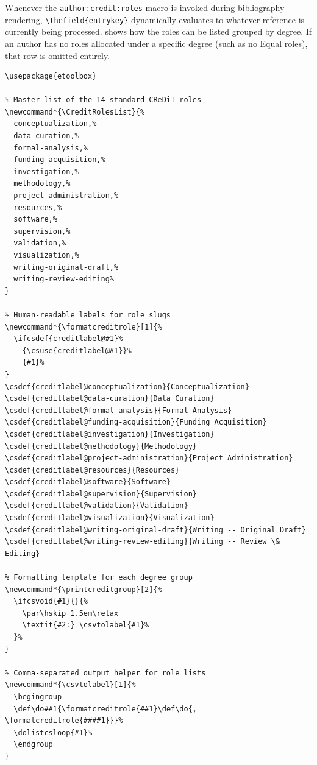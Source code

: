 \documentclass[12pt, twoside]{article}
\begin{document}
Whenever the \texttt{author:credit:roles} macro is invoked during bibliography rendering, \texttt{\textbackslash thefield\{entrykey\}} dynamically evaluates to whatever reference is currently being processed.  shows how the roles can be listed grouped by degree. If an author has no roles allocated under a specific degree (such as no Equal roles), that row is omitted entirely.
\begin{lstlisting}[style=latexExampleForAuthors, escapechar=|, basicstyle=\footnotesize, caption={{Listing CReDiT roles grouped by degree}}, label=lst:biberCReDiTrolesGroupedByDegree]
\usepackage{etoolbox}

% Master list of the 14 standard CReDiT roles
\newcommand*{\CreditRolesList}{%
  conceptualization,%
  data-curation,%
  formal-analysis,%
  funding-acquisition,%
  investigation,%
  methodology,%
  project-administration,%
  resources,%
  software,%
  supervision,%
  validation,%
  visualization,%
  writing-original-draft,%
  writing-review-editing%
}

% Human-readable labels for role slugs
\newcommand*{\formatcreditrole}[1]{%
  \ifcsdef{creditlabel@#1}%
    {\csuse{creditlabel@#1}}%
    {#1}%
}
\csdef{creditlabel@conceptualization}{Conceptualization}
\csdef{creditlabel@data-curation}{Data Curation}
\csdef{creditlabel@formal-analysis}{Formal Analysis}
\csdef{creditlabel@funding-acquisition}{Funding Acquisition}
\csdef{creditlabel@investigation}{Investigation}
\csdef{creditlabel@methodology}{Methodology}
\csdef{creditlabel@project-administration}{Project Administration}
\csdef{creditlabel@resources}{Resources}
\csdef{creditlabel@software}{Software}
\csdef{creditlabel@supervision}{Supervision}
\csdef{creditlabel@validation}{Validation}
\csdef{creditlabel@visualization}{Visualization}
\csdef{creditlabel@writing-original-draft}{Writing -- Original Draft}
\csdef{creditlabel@writing-review-editing}{Writing -- Review \& Editing}

% Formatting template for each degree group
\newcommand*{\printcreditgroup}[2]{%
  \ifcsvoid{#1}{}{%
    \par\hskip 1.5em\relax
    \textit{#2:} \csvtolabel{#1}%
  }%
}

% Comma-separated output helper for role lists
\newcommand*{\csvtolabel}[1]{%
  \begingroup
  \def\do##1{\formatcreditrole{##1}\def\do{, \formatcreditrole{####1}}}%
  \dolistcsloop{#1}%
  \endgroup
}


\end{lstlisting}
\end{document}
